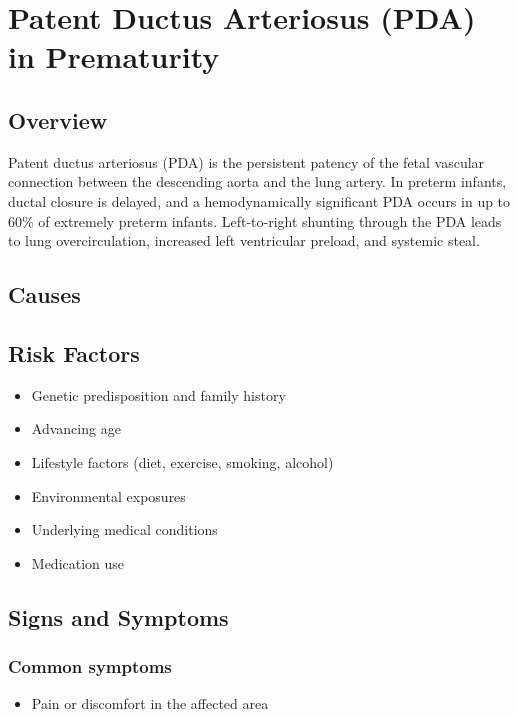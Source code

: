 \chapter{Patent Ductus Arteriosus (PDA) in Prematurity}
\label{sec:Patent Ductus Arteriosus in Prematurity}

\section{Overview}
Patent ductus arteriosus (PDA) is the persistent patency of the fetal vascular connection between the descending aorta and the lung artery. In preterm infants, ductal closure is delayed, and a hemodynamically significant PDA occurs in up to 60\% of extremely preterm infants. Left-to-right shunting through the PDA leads to lung overcirculation, increased left ventricular preload, and systemic steal.
\section{Causes}
\section{Risk Factors}

\begin{itemize}[noitemsep]
  \item Genetic predisposition and family history
  \item Advancing age
  \item Lifestyle factors (diet, exercise, smoking, alcohol)
  \item Environmental exposures
  \item Underlying medical conditions
  \item Medication use
\end{itemize}
\section{Signs and Symptoms}

\subsection{Common symptoms}
\begin{itemize}[noitemsep]
  \item Pain or discomfort in the affected area
  \end{itemize}

